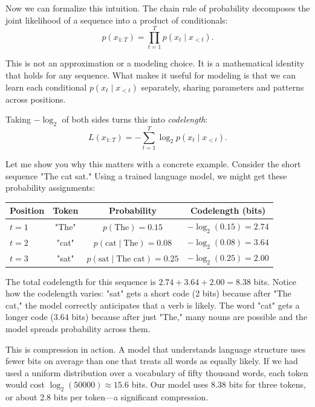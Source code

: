 Now we can formalize this intuition. The chain rule of probability decomposes the joint likelihood of a sequence into a product of conditionals:
\begin{equation}
p(x_{1:T}) = \prod_{t=1}^{T} p(x_t \mid x_{<t}).
\label{eq:chainrule}
\end{equation}

This is not an approximation or a modeling choice. It is a mathematical identity that holds for any sequence. What makes it useful for modeling is that we can learn each conditional $p(x_t \mid x_{<t})$ separately, sharing parameters and patterns across positions.

Taking $-\log_2$ of both sides turns this into \emph{codelength}:
\begin{equation}
L(x_{1:T}) = -\sum_{t=1}^{T} \log_2 p(x_t \mid x_{<t}).
\label{eq:codelength}
\end{equation}

Let me show you why this matters with a concrete example. Consider the short sequence "The cat sat." Using a trained language model, we might get these probability assignments:

\begin{center}
\begin{tabular}{lccc}
\toprule
\textbf{Position} & \textbf{Token} & \textbf{Probability} & \textbf{Codelength (bits)} \\
\midrule
$t=1$ & "The" & $p(\text{The}) = 0.15$ & $-\log_2(0.15) = 2.74$ \\
$t=2$ & "cat" & $p(\text{cat} \mid \text{The}) = 0.08$ & $-\log_2(0.08) = 3.64$ \\
$t=3$ & "sat" & $p(\text{sat} \mid \text{The cat}) = 0.25$ & $-\log_2(0.25) = 2.00$ \\
\bottomrule
\end{tabular}
\end{center}

The total codelength for this sequence is $2.74 + 3.64 + 2.00 = 8.38$ bits. Notice how the codelength varies: "sat" gets a short code (2 bits) because after "The cat," the model correctly anticipates that a verb is likely. The word "cat" gets a longer code (3.64 bits) because after just "The," many nouns are possible and the model spreads probability across them.

This is compression in action. A model that understands language structure uses fewer bits on average than one that treats all words as equally likely. If we had used a uniform distribution over a vocabulary of fifty thousand words, each token would cost $\log_2(50000) \approx 15.6$ bits. Our model uses 8.38 bits for three tokens, or about 2.8 bits per token---a significant compression.

